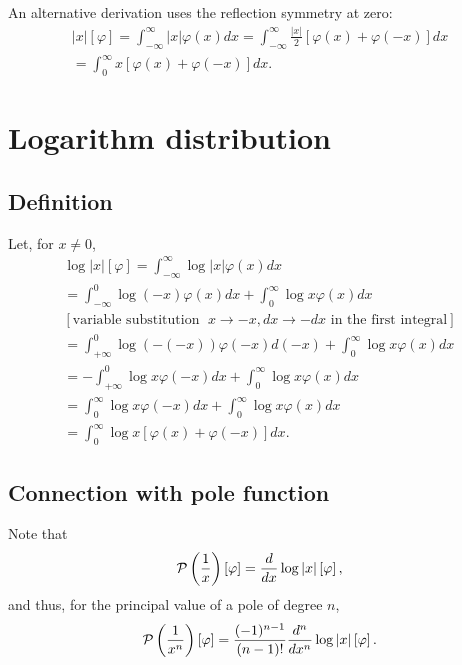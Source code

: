 An alternative derivation uses the reflection symmetry at zero:
\begin{equation}
\begin{split}
\left|x\right| \left[ \varphi \right]
=
\int_{-\infty}^\infty  \left|x\right|  \varphi(x) dx
=
\int_{-\infty}^\infty    \frac{\left|x\right|}{2}\left[\varphi(x) + \varphi (-x)\right] dx   \\
=
\int_{0}^\infty  x  \left[\varphi(x) + \varphi (-x)\right] dx
.
\end{split}
\end{equation}


\section{Logarithm distribution}

\subsection{Definition}
Let, for $x\neq 0$,
\begin{equation}
\begin{split}
\log \left|x\right| \left[ \varphi \right]
=
\int_{-\infty}^\infty  \log \left|x\right|  \varphi(x) dx
\\
=
\int_{-\infty}^0 \log (-x)   \varphi(x) dx
+
\int_{0}^\infty   \log x    \varphi(x) dx
\\
[\textrm{variable substitution }\; x\rightarrow -x, dx \rightarrow -dx \textrm{ in the first integral}]
\\
=
\int_{+\infty}^0  \log  (-(-x))     \varphi(-x) d(-x)
+
\int_{0}^\infty   \log x    \varphi(x) dx
\\
=
-\int_{+\infty}^0  \log x    \varphi(-x) d x
+
\int_{0}^\infty   \log x    \varphi(x) dx
\\
=
\int_0^{\infty}  \log x    \varphi(-x) d x
+
\int_{0}^\infty   \log x    \varphi(x) dx
\\
=
\int_0^{\infty}  \log x  \left[  \varphi(x)
+
   \varphi(-x) \right] dx
 .
\end{split}
\label{2012-m-ch-di-logdidef}
\end{equation}

\subsection{Connection with pole function}
Note that
\begin{equation}
 {\cal P} \left(\frac{1}{x}\right) \left[\varphi\right]  = \frac{d}{dx} \log \vert x \vert \left[\varphi\right]
,
\label{2014-m-ch-di-cwtpf}
\end{equation}
and thus,
for the principal value of a pole of degree $n$,
\begin{equation}
  {\cal P} \left(\frac{1}{x^n}\right) \left[\varphi\right]  =  \frac{(-1)^{n-1}}{(n-1)!}
\frac{d^n}{dx^n} \log \vert x \vert \left[\varphi\right]
.
\label{2014-m-ch-di-cwtpf2}
\end{equation}


